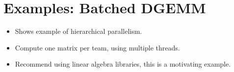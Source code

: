 \section{Examples: Batched DGEMM}
\begin{itemize}
  \item Shows example of hierarchical parallelism.
  \item Compute one matrix per team, using multiple threads.
  \item Recommend using linear algebra libraries, this is a motivating example.
\end{itemize}

